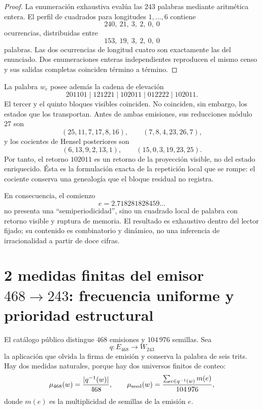 \begin{proof}
La enumeración exhaustiva evalúa las \(243\) palabras mediante aritmética
entera. El perfil de cuadrados para longitudes \(1,\ldots,6\) contiene
\[
 240,\ 21,\ 3,\ 2,\ 0,\ 0
\]
ocurrencias, distribuidas entre
\[
 153,\ 19,\ 3,\ 2,\ 0,\ 0
\]
palabras. Las dos ocurrencias de longitud cuatro son exactamente las del
enunciado. Dos enumeraciones enteras independientes reproducen el mismo censo
y sus salidas completas coinciden término a término.
\end{proof}

La palabra \(w_e\) posee además la cadena de elevación
\[
201101\mid121221\mid102011\mid012222\mid102011.
\]
El tercer y el quinto bloques visibles coinciden. No coinciden, sin embargo,
los estados que los transportan. Antes de ambas emisiones, sus reducciones
módulo \(27\) son
\[
(25,11,7,17,8,16),
\qquad
(7,8,4,23,26,7),
\]
y los cocientes de Hensel posteriores son
\[
(6,13,9,2,13,1),
\qquad
(15,0,3,19,23,25).
\]
Por tanto, el retorno \(102011\) es un retorno de la proyección visible, no
del estado enriquecido. Ésta es la formulación exacta de la repetición local
que se rompe: el cociente conserva una genealogía que el bloque residual no
registra.

En consecuencia, el comienzo
\[
e=2.718281828459\ldots
\]
no presenta una ``semiperiodicidad'', sino un cuadrado local de palabra con
retorno visible y ruptura de memoria. El resultado es exhaustivo dentro del
lector fijado; su contenido es combinatorio y dinámico, no una inferencia de
irracionalidad a partir de doce cifras.

\section[2 medidas finitas del emisor 468 a 243]{2 medidas finitas del emisor \texorpdfstring{\(468\to243\)}{468→243}: frecuencia uniforme y prioridad estructural}

El catálogo público distingue \(468\) emisiones y \(104\,976\) semillas.
Sea
\[
 q:E_{468}\longrightarrow W_{243}
\]
la aplicación que olvida la firma de emisión y conserva la palabra de seis
trits. Hay dos medidas naturales, porque hay dos universos finitos de conteo:
\[
 \mu_{468}(w)=\frac{|q^{-1}(w)|}{468},
 \qquad
 \mu_{\rm seed}(w)=
 \frac{\sum_{e\in q^{-1}(w)}m(e)}{104\,976},
\]
donde \(m(e)\) es la multiplicidad de semillas de la emisión \(e\).

